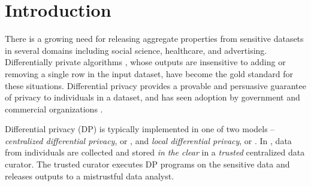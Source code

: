 \section{Introduction}


There is a growing need for releasing aggregate properties from sensitive datasets in several domains  including social science, healthcare, and advertising. Differentially private algorithms \cite{dwork}, whose outputs are insensitive to adding or removing a single row in the input dataset, have become the gold standard for these situations. Differential privacy provides a provable and persuasive guarantee of privacy to individuals in a dataset, and has seen adoption by government \cite{machanavajjhala08onthemap,Vilhuber17Proceedings} and commercial organizations \cite{Rappor1,Apple, Samsung}. %

Differential privacy (DP) is typically implemented in one of two models -- \textit{centralized differential privacy}, or \cdp, and \textit{local differential privacy}, or \ldp. In \cdp, data from individuals are collected and stored \textit{in the clear} in a \textit{trusted} centralized data curator. The trusted curator executes DP programs on the sensitive data  and releases outputs to a mistrustful data analyst. %


